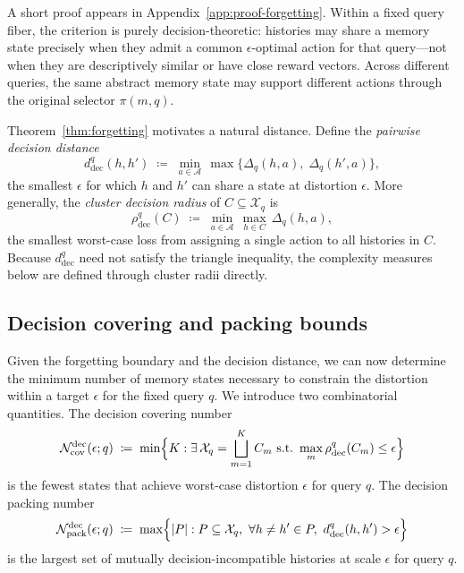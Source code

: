\documentclass{article}
\theoremstyle{plain}
\theoremstyle{definition}
\theoremstyle{remark}
\newcommand{\cA}{\mathcal{A}}
\newcommand{\cX}{\mathcal{X}}
\newcommand{\cN}{\mathcal{N}}
\newcommand{\eps}{\epsilon}
\begin{document}
\noindent A short proof appears in Appendix~\ref{app:proof-forgetting}.
Within a fixed query fiber, the criterion is purely decision-theoretic:
histories may share a memory state precisely when they admit a common
\(\eps\)-optimal action for that query---not when they are descriptively
similar or have close reward vectors. Across different queries, the same
abstract memory state may support different actions through the original
selector \(\pi(m,q)\).

Theorem~\ref{thm:forgetting} motivates a natural distance. Define the
\emph{pairwise decision distance}
\begin{equation}
\label{eq:ddec}
d_{\mathrm{dec}}^q(h,h')
\;\coloneqq\;
\min_{a\in\cA}\,\max\!\bigl\{\Delta_q(h,a),\;\Delta_q(h',a)\bigr\},
\end{equation}
the smallest \(\eps\) for which \(h\) and \(h'\) can share a state at
distortion \(\eps\). More generally, the \emph{cluster decision radius} of
\(C\subseteq\cX_q\) is
\[
\rho_{\mathrm{dec}}^q(C)
\;\coloneqq\;
\min_{a\in\cA}\,\max_{h\in C}\,\Delta_q(h,a),
\]
the smallest worst-case loss from assigning a single action to all histories
in \(C\). Because \(d_{\mathrm{dec}}^q\) need not satisfy the triangle
inequality, the complexity measures below are defined through cluster radii
directly.

\vspace{-0.3em}
\subsection{Decision covering and packing bounds}
\label{sec:limits}
\vspace{-0.3em}
Given the forgetting boundary and the decision distance, we can now determine
the minimum number of memory states necessary to constrain the distortion
within a target \(\eps\) for the fixed query \(q\). 
We introduce two combinatorial quantities. 
The decision covering number
\begin{equation}
\label{eq:covering}
\cN^{\mathrm{dec}}_{\mathrm{cov}}(\eps;q)
\;\coloneqq\;
\min\Bigl\{
K : \exists\, \cX_q=\bigsqcup_{m=1}^{K} C_m
\ \text{s.t.}\ 
\max_m \rho_{\mathrm{dec}}^q(C_m)\le \eps
\Bigr\}
\end{equation}
is the fewest states that achieve worst-case distortion \(\eps\) for query
\(q\). The decision packing number
\begin{equation}
\label{eq:packing}
\cN^{\mathrm{dec}}_{\mathrm{pack}}(\eps;q)
\;\coloneqq\;
\max\Bigl\{
|P| : P\subseteq\cX_q,\ 
\forall h\ne h'\in P,\ 
d_{\mathrm{dec}}^q(h,h')>\eps
\Bigr\}
\end{equation}
is the largest set of mutually decision-incompatible histories at scale
\(\eps\) for query \(q\).
\end{document}
